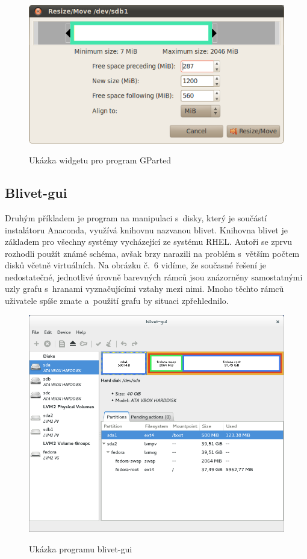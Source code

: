 \documentclass[color,table,oneside,nolot,nolof]{fithesis}
\begin{document}
 \begin{figure}[h!]
	 \label{fig:gparted}
	 \caption{Ukázka widgetu pro program GParted~\cite{GParted}}
	 \centering
	 \includegraphics[width=.6\columnwidth]{pictures/gparted-5-big.png}\\
 \end{figure}

 \subsection{Blivet-gui}

 Druhým příkladem je program na manipulaci s~disky, který je součástí instalátoru Anaconda, využívá knihovnu nazvanou blivet. Knihovna blivet je základem pro všechny systémy vycházející ze systému RHEL. Autoři 
 se zprvu rozhodli použít známé schéma, avšak brzy narazili na problém s~větším počtem disků včetně virtuálních. Na obrázku č.~6 vidíme, že současné řešení je nedostatečné, jednotlivé úrovně barevných rámců 
 jsou znázorněny samostatnými uzly grafu s~hranami vyznačujícími vztahy mezi nimi. Mnoho těchto rámců uživatele spíše zmate a~použití grafu by situaci zpřehlednilo.

 \begin{figure}[h!]
	 \label{fig:blivet}
	 \caption{Ukázka programu blivet-gui~\cite{blivet-gui}}
	 \centering
	 \includegraphics[width=.6\columnwidth]{pictures/blivet-gui-1.png}\\
 \end{figure}
\end{document}
